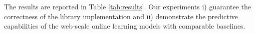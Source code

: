 \documentclass[letterpaper]{article} %
\begin{document}
The results are reported in Table \ref{tab:results}. Our experiments i) guarantee the correctness of the library implementation and ii) demonstrate the predictive capabilities of the web-scale online learning models with comparable baselines. 



\end{document}
